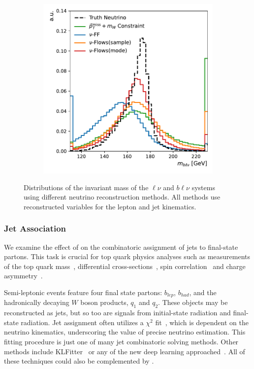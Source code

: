 \begin{figure}[htp]
\begin{subfigure}{0.40\textwidth}
        \includegraphics[width=\textwidth]{Figures/neutrino_unfolding/blnu_mass.pdf}
    \caption{} \label{fig:blv_mass}
    \end{subfigure}
    \caption{Distributions of the invariant mass of the $\ell\nu$  and $b\ell\nu$  systems using different neutrino reconstruction methods. All methods use reconstructed variables for the lepton and jet kinematics.}
    \label{fig:real_assoc_masses}
\end{figure}

\subsubsection{Jet Association}

We examine the effect of \vflows on the combinatoric assignment of jets to final-state partons.
This task is crucial for top quark physics analyses such as measurements of the top quark mass~\cite{ATLAS:2015pfy,CMS:2018quc,ATLAS:2018fwq,ATLAS:2019guf}, differential cross-sections~\cite{CMS:2016oae,CMS:2018htd,Quad4,CMS:2021vhb}, spin correlation~\cite{CMS:2015cal} and charge asymmetry~\cite{ATLAS:2022waa}.

Semi-leptonic \ttbar events feature four final state partons: $b_{lep}$, $b_{had}$, and the hadronically decaying $W$ boson products, $q_1$ and $q_2$.
These objects may be reconstructed as jets, but so too are signals from initial-state radiation and final-state radiation.
Jet assignment often utilizes a $\chi^2$ fit~\cite{Chi2ATLAS}, which is dependent on the neutrino kinematics, underscoring the value of precise neutrino estimation.
This fitting procedure is just one of many jet combinatoric solving methods.
Other methods include KLFitter~\cite{KLFitter} or any of the new deep learning approached~\cite{SAJA, SPANet, Spatter, TopoGraphs}.
All of these techniques could also be complemented by \vflows.

